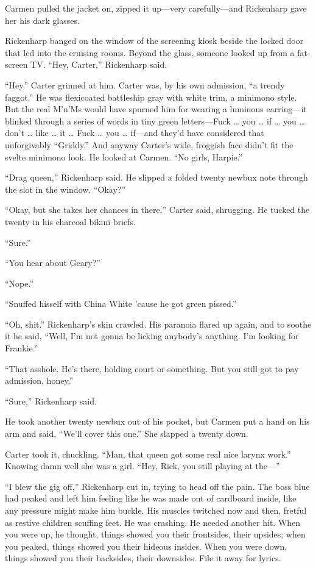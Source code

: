 Carmen pulled the jacket on, zipped it up—very carefully—and Rickenharp gave her his dark glasses.

Rickenharp banged on the window of the screening kiosk beside the locked door that led into the cruising rooms. Beyond the glass, someone looked up from a fat-screen TV. “Hey, Carter,” Rickenharp said.

“Hey.” Carter grinned at him. Carter was, by his own admission, “a trendy faggot.” He was flexicoated battleship gray with white trim, a minimono style. But the real M’n’Ms would have spurned him for wearing a luminous earring—it blinked through a series of words in tiny green letters—Fuck … you … if … you … don’t … like … it … Fuck … you … if—and they’d have considered that unforgivably “Griddy.” And anyway Carter’s wide, froggish face didn’t fit the svelte minimono look. He looked at Carmen. “No girls, Harpie.”

“Drag queen,” Rickenharp said. He slipped a folded twenty newbux note through the slot in the window. “Okay?”

“Okay, but she takes her chances in there,” Carter said, shrugging. He tucked the twenty in his charcoal bikini briefs.

“Sure.”

“You hear about Geary?”

“Nope.”

“Snuffed hisself with China White ’cause he got green pissed.”

“Oh, shit.” Rickenharp’s skin crawled. His paranoia flared up again, and to soothe it he said, “Well, I’m not gonna be licking anybody’s anything. I’m looking for Frankie.”

“That asshole. He’s there, holding court or something. But you still got to pay admission, honey.”

“Sure,” Rickenharp said.

He took another twenty newbux out of his pocket, but Carmen put a hand on his arm and said, “We’ll cover this one.” She slapped a twenty down.

Carter took it, chuckling. “Man, that queen got some real nice larynx work.” Knowing damn well she was a girl. “Hey, Rick, you still playing at the—”

“I blew the gig off,” Rickenharp cut in, trying to head off the pain. The boss blue had peaked and left him feeling like he was made out of cardboard inside, like any pressure might make him buckle. His muscles twitched now and then, fretful as restive children scuffing feet. He was crashing. He needed another hit. When you were up, he thought, things showed you their frontsides, their upsides; when you peaked, things showed you their hideous insides. When you were down, things showed you their backsides, their downsides. File it away for lyrics.

